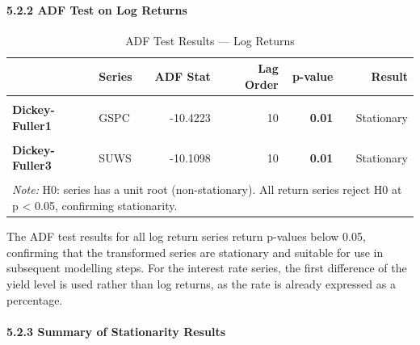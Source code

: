 \documentclass[
]{article}
\begin{document}
\paragraph{5.2.2 ADF Test on Log Returns}\label{adf-test-on-log-returns}

\begingroup\fontsize{10}{12}\selectfont

\begin{longtable}[t]{>{}llrr>{}rr}
\caption{\label{tab:stationarity-returns}ADF Test Results — Log Returns}\\
\toprule
 & Series & ADF Stat & Lag Order & p-value & Result\\
\midrule
\textbf{\cellcolor{gray!10}{Dickey-Fuller}} & \cellcolor{gray!10}{ESGU} & \cellcolor{gray!10}{-10.3470} & \cellcolor{gray!10}{10} & \textbf{\cellcolor{gray!10}{0.01}} & \cellcolor{gray!10}{Stationary}\\
\textbf{Dickey-Fuller1} & GSPC & -10.4223 & 10 & \textbf{0.01} & Stationary\\
\textbf{\cellcolor{gray!10}{Dickey-Fuller2}} & \cellcolor{gray!10}{IWDA} & \cellcolor{gray!10}{-9.4243} & \cellcolor{gray!10}{10} & \textbf{\cellcolor{gray!10}{0.01}} & \cellcolor{gray!10}{Stationary}\\
\textbf{Dickey-Fuller3} & SUWS & -10.1098 & 10 & \textbf{0.01} & Stationary\\
\textbf{\cellcolor{gray!10}{Dickey-Fuller4}} & \cellcolor{gray!10}{Rate\_10Y (differenced)} & \cellcolor{gray!10}{-10.1155} & \cellcolor{gray!10}{10} & \textbf{\cellcolor{gray!10}{0.01}} & \cellcolor{gray!10}{Stationary}\\
\bottomrule
\multicolumn{6}{l}{\rule{0pt}{1em}\textit{Note: } H0: series has a unit root (non-stationary). All return series reject H0 at p < 0.05, confirming stationarity.}\\
\end{longtable}
\endgroup{}

The ADF test results for all log return series return p-values below
0.05, confirming that the transformed series are stationary and suitable
for use in subsequent modelling steps. For the interest rate series, the
first difference of the yield level is used rather than log returns, as
the rate is already expressed as a percentage.

\paragraph{5.2.3 Summary of Stationarity
Results}\label{summary-of-stationarity-results}
\end{document}
